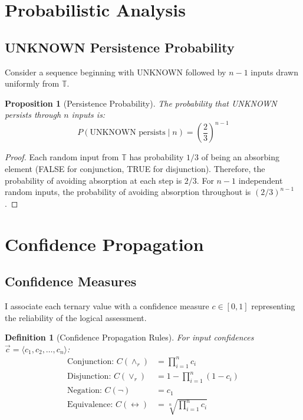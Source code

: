 \documentclass[11pt,a4paper]{article}
\newtheorem{definition}{Definition}
\newtheorem{proposition}{Proposition}
\begin{document}
\section{Probabilistic Analysis}

\subsection{UNKNOWN Persistence Probability}

Consider a sequence beginning with UNKNOWN followed by $n-1$ inputs drawn uniformly from $\mathbb{T}$.

\begin{proposition}[Persistence Probability]
The probability that UNKNOWN persists through $n$ inputs is:
\begin{equation}
P(\text{UNKNOWN persists} \mid n) = \left(\frac{2}{3}\right)^{n-1}
\end{equation}
\end{proposition}

\begin{proof}
Each random input from $\mathbb{T}$ has probability $1/3$ of being an absorbing element (FALSE for conjunction, TRUE for disjunction). Therefore, the probability of avoiding absorption at each step is $2/3$. For $n-1$ independent random inputs, the probability of avoiding absorption throughout is $(2/3)^{n-1}$.
\end{proof}

\section{Confidence Propagation}

\subsection{Confidence Measures}

I associate each ternary value with a confidence measure $c \in [0,1]$ representing the reliability of the logical assessment.

\begin{definition}[Confidence Propagation Rules]
For input confidences $\vec{c} = \langle c_1, c_2, \ldots, c_n \rangle$:
\begin{align}
\text{Conjunction: } C(\land_r) &= \prod_{i=1}^{n} c_i \\
\text{Disjunction: } C(\lor_r) &= 1 - \prod_{i=1}^{n} (1 - c_i) \\
\text{Negation: } C(\neg) &= c_1 \\
\text{Equivalence: } C(\leftrightarrow) &= \sqrt[n]{\prod_{i=1}^{n} c_i}
\end{align}
\end{definition}
\end{document}
